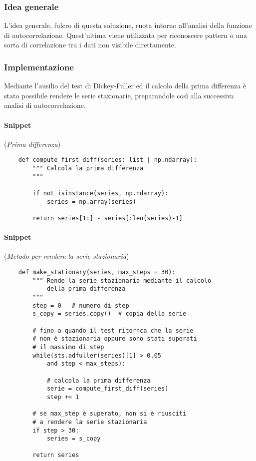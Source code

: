 \subsubsection{Idea generale}
L'idea generale, fulcro di questa soluzione, ruota intorno all'analisi della funzione di autocorrelazione.
Quest'ultima viene utilizzata per riconoscere pattern o una sorta di correlazione tra i dati non
visibile direttamente.

\subsubsection{Implementazione}
Mediante l'ausilio del test di Dickey-Fuller ed il calcolo della prima differenza è stato possibile
rendere le serie stazionarie, preparandole così alla successiva analisi di autocorrelazione.
\\
\paragraph*{Snippet} (\textit{Prima differenza})
\begin{verbatim}
    def compute_first_diff(series: list | np.ndarray):
        """ Calcola la prima differenza
        """
        
        if not isinstance(series, np.ndarray):
            series = np.array(series)

        return series[1:] - series[:len(series)-1]
\end{verbatim}

\paragraph*{Snippet} (\textit{Metodo per rendere la serie stazionaria})
\begin{verbatim}
    def make_stationary(series, max_steps = 30):
        """ Rende la serie stazionaria mediante il calcolo
            della prima differenza
        """
        step = 0   # numero di step
        s_copy = series.copy()  # copia della serie
        
        # fino a quando il test ritornca che la serie
        # non è stazionaria oppure sono stati superati
        # il massimo di step
        while(sts.adfuller(series)[1] > 0.05 
            and step < max_steps):
            
            # calcola la prima differenza
            serie = compute_first_diff(series)
            step += 1

        # se max_step è superato, non si è riusciti
        # a rendere la serie stazionaria
        if step > 30:
            series = s_copy

        return series
\end{verbatim}

